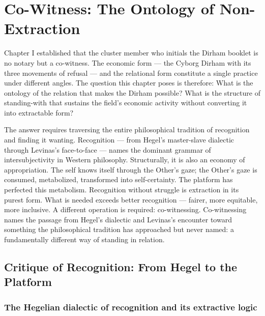 \chapter{Co-Witness: The Ontology of Non-Extraction}
\label{ch:02}

Chapter I established that the cluster member who initials the Dirham booklet is no notary but a co-witness. The economic form — the Cyborg Dirham with its three movements of refusal — and the relational form constitute a single practice under different angles. The question this chapter poses is therefore: What is the ontology of the relation that makes the Dirham possible? What is the structure of standing-with that sustains the field's economic activity without converting it into extractable form?

The answer requires traversing the entire philosophical tradition of recognition and finding it wanting. Recognition — from Hegel's master-slave dialectic through Levinas's face-to-face — names the dominant grammar of intersubjectivity in Western philosophy. Structurally, it is also an economy of appropriation. The self knows itself through the Other's gaze; the Other's gaze is consumed, metabolized, transformed into self-certainty. The platform has perfected this metabolism. Recognition without struggle is extraction in its purest form. What is needed exceeds better recognition — fairer, more equitable, more inclusive. A different operation is required: co-witnessing. Co-witnessing names the passage from Hegel's dialectic and Levinas's encounter toward something the philosophical tradition has approached but never named: a fundamentally different way of standing in relation.

\section{Critique of Recognition: From Hegel to the Platform}

\subsection{The Hegelian dialectic of recognition and its extractive logic}

